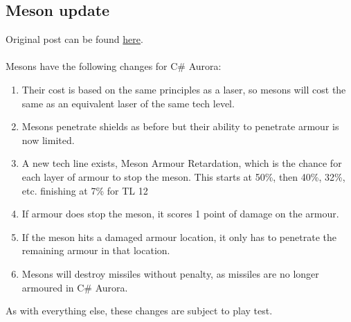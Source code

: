 \documentclass[../../Aurora C# unofficial manual.tex]{subfiles}
\begin{document}
		\subsection{Meson update}
	Original post can be found
	\href{http://aurora2.pentarch.org/index.php?topic=8495.msg111663#msg111663}{here}.
	\\\\
	
	Mesons have the following changes for C\# Aurora:
	\begin{enumerate}
		\item Their cost is based on the same principles as a laser, so mesons will cost the same as an equivalent laser of the same tech level.
		\item Mesons penetrate shields as before but their ability to penetrate armour is now limited.
		\item A new tech line exists, Meson Armour Retardation, which is the chance for each layer of armour to stop the meson. This starts at 50\%, then 40\%, 32\%, etc. finishing at 7\% for TL 12
		\item If armour does stop the meson, it scores 1 point of damage on the armour.
		\item If the meson hits a damaged armour location, it only has to penetrate the remaining armour in that location.
		\item Mesons will destroy missiles without penalty, as missiles are no longer armoured in C\# Aurora.
	\end{enumerate}
	As with everything else, these changes are subject to play test.
\end{document}
